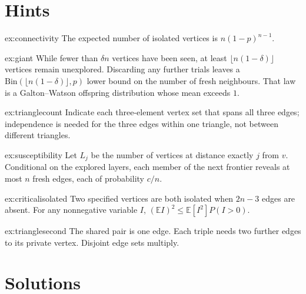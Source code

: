 \section{Hints}

\begin{hint}{ex:connectivity}
The expected number of isolated vertices is $n(1-p)^{n-1}$.
\end{hint}

\begin{hint}{ex:giant}
While fewer than $\delta n$ vertices have been seen, at least $\lfloor n(1-\delta)\rfloor$ vertices remain unexplored. Discarding any further trials leaves a $\mathrm{Bin}(\lfloor n(1-\delta)\rfloor,p)$ lower bound on the number of fresh neighbours. That law is a Galton--Watson offspring distribution whose mean exceeds $1$.
\end{hint}


\begin{hint}{ex:trianglecount}
Indicate each three-element vertex set that spans all three edges; independence is needed for the three edges within one triangle, not between different triangles.
\end{hint}
\begin{hint}{ex:susceptibility}
Let $L_j$ be the number of vertices at distance exactly $j$ from $v$. Conditional on the explored layers, each member of the next frontier reveals at most $n$ fresh edges, each of probability $c/n$.
\end{hint}
\begin{hint}{ex:criticalisolated}
Two specified vertices are both isolated when $2n-3$ edges are absent. For any nonnegative variable $I$, $(\mathbb E I)^2\le \mathbb E[I^2]P(I>0)$.
\end{hint}
\begin{hint}{ex:trianglesecond}
The shared pair is one edge. Each triple needs two further edges to its private vertex. Disjoint edge sets multiply.
\end{hint}

\section{Solutions}

